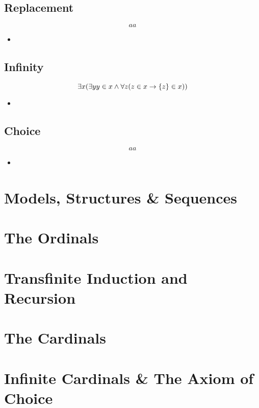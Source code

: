 \subsection{Replacement}
\begin{equation*}
aa
\end{equation*}

\begin{itemize}
	
	\item 
	
\end{itemize}

\subsection{Infinity}
\begin{equation*}
\exists x (\exists y y \in x \land \forall z (z \in x \rightarrow \left\lbrace z \right\rbrace \in x))
\end{equation*}

\begin{itemize}
	
	\item 
	
\end{itemize}

\subsection{Choice}
\begin{equation*}
aa
\end{equation*}

\begin{itemize}
	
	\item 
	
\end{itemize}












\section{Models, Structures \& Sequences}

\section{The Ordinals}

\section{Transfinite Induction and Recursion}

\section{The Cardinals}

\section{Infinite Cardinals \& The Axiom of Choice}